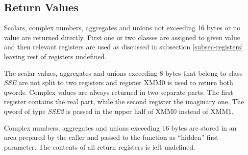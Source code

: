
\subsection{Return Values}

Scalars, complex numbers, aggregates and unions not exceeding 16 bytes or no
value are returned directly.  First one or two classes are assigned to given
value and then relevant registers are used as discussed in subsection
\ref{subsec-registers} leaving rest of registers undefined.

The scalar values, aggregates and unions exceeding 8 bytes that
belong to class \emph{SSE} are not split to two registers and
register XMM0 is used to return both qwords.  Complex values are
always returned in two separate parts.  The first register contains
the real part, while the second register the imaginary one. The qword
of type \emph{SSE2} is passed in the upper half of XMM0 instead of
XMM1.

Complex numbers, aggregates and unions exceeding 16 bytes are stored
in an area prepared by the caller and passed to the function as
``hidden'' first parameter.  The contents of all return registers is
left undefined.



